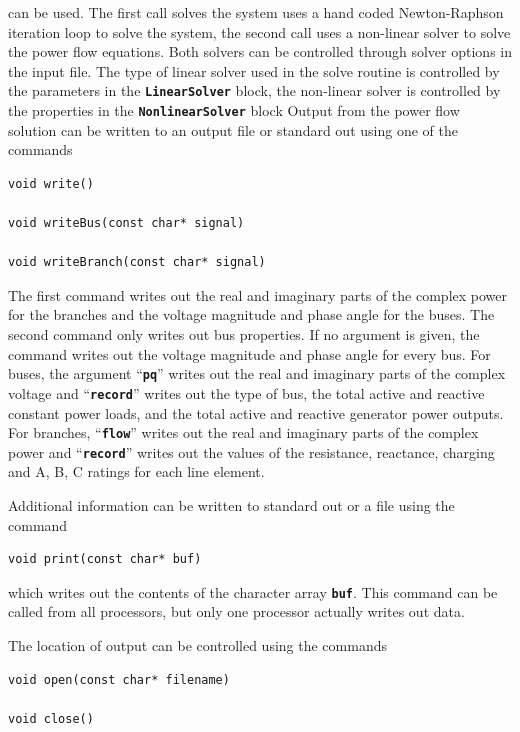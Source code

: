 \documentclass[12pt]{report} %
\begin{document}
can be used. The first call solves the system uses a hand coded Newton-Raphson iteration loop to solve the system, the second call uses a non-linear solver to solve the power flow equations. Both solvers can be controlled through solver options in the input file. The type of linear solver used in the solve routine is controlled by the parameters in the \texttt{\textbf{LinearSolver}} block, the non-linear solver is controlled by the properties in the \texttt{\textbf{NonlinearSolver}} block
Output from the power flow solution can be written to an output file or standard out using one of the commands

{
\color{red}
\begin{Verbatim}[fontseries=b]
void write()

void writeBus(const char* signal)

void writeBranch(const char* signal)
\end{Verbatim}
}

The first command writes out the real and imaginary parts of the complex power for the branches and the voltage magnitude and phase angle for the buses. The second command only writes out bus properties. If no argument is given, the command writes out the voltage magnitude and phase angle for every bus. For buses, the argument ``\texttt{\textbf{pq}}'' writes out the real and imaginary parts of the complex voltage and ``\texttt{\textbf{record}}'' writes out the type of bus, the total active and reactive constant power loads, and the total active and reactive generator power outputs. For branches, ``\texttt{\textbf{flow}}'' writes out the real and imaginary parts of the complex power and ``\texttt{\textbf{record}}'' writes out the values of the resistance, reactance, charging and A, B, C ratings for each line element.

Additional information can be written to standard out or a file using the command

{
\color{red}
\begin{Verbatim}[fontseries=b]
void print(const char* buf)
\end{Verbatim}
}

which writes out the contents of the character array \texttt{\textbf{buf}}. This command can be called from all processors, but only one processor actually writes out data.

The location of output can be controlled using the commands

{
\color{red}
\begin{Verbatim}[fontseries=b]
void open(const char* filename)

void close()
\end{Verbatim}
}
\end{document}
